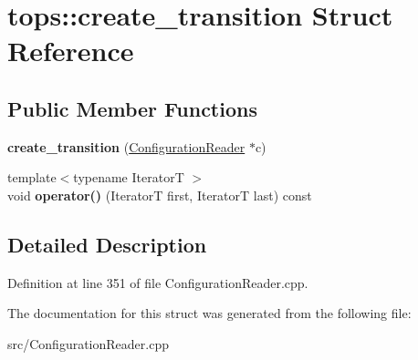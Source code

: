 \hypertarget{structtops_1_1create__transition}{}\section{tops\+:\+:create\+\_\+transition Struct Reference}
\label{structtops_1_1create__transition}
\subsection*{Public Member Functions}
\begin{DoxyCompactItemize}
\item 
\mbox{\label{structtops_1_1create__transition_a7d9f157d895f76e4a280a43226497f74}} 
{\bfseries create\+\_\+transition} (\hyperlink{classtops_1_1ConfigurationReader}{Configuration\+Reader} $\ast$c)
\item 
\mbox{\label{structtops_1_1create__transition_a8b642ac7f756936a738a51801c0ad2b0}} 
{\footnotesize template$<$typename IteratorT $>$ }\\void {\bfseries operator()} (IteratorT first, IteratorT last) const
\end{DoxyCompactItemize}


\subsection{Detailed Description}


Definition at line 351 of file Configuration\+Reader.\+cpp.



The documentation for this struct was generated from the following file\+:\begin{DoxyCompactItemize}
\item 
src/Configuration\+Reader.\+cpp\end{DoxyCompactItemize}
